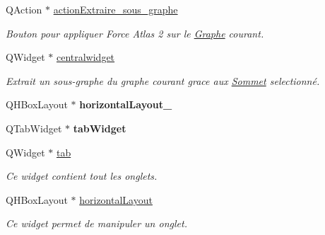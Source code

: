 \begin{DoxyCompactItemize}
Q\+Action $\ast$ \hyperlink{classUi__MainWindow_a916d6accc699ec09971de6e086049674}{action\+Extraire\+\_\+sous\+\_\+graphe}
\begin{DoxyCompactList}\small\item\em Bouton pour appliquer Force Atlas 2 sur le \hyperlink{classGraphe}{Graphe} courant. \end{DoxyCompactList}\item 
\mbox{\label{classUi__MainWindow_a39420100bfee3ba57f137af5a3b0f8e9}} 
Q\+Widget $\ast$ \hyperlink{classUi__MainWindow_a39420100bfee3ba57f137af5a3b0f8e9}{centralwidget}
\begin{DoxyCompactList}\small\item\em Extrait un sous-\/graphe du graphe courant grace aux \hyperlink{classSommet}{Sommet} selectionn\'{e}. \end{DoxyCompactList}\item 
\mbox{\label{classUi__MainWindow_a03ce63974cc69b067c91bbf285cceca8}} 
Q\+H\+Box\+Layout $\ast$ {\bfseries horizontal\+Layout\+\_}
\item 
\mbox{\label{classUi__MainWindow_a13404ee3b30e38230383dd765a5eec4a}} 
Q\+Tab\+Widget $\ast$ {\bfseries tab\+Widget}
\item 
\mbox{\label{classUi__MainWindow_a97e497a37904b5538bba9c218f40cb58}} 
Q\+Widget $\ast$ \hyperlink{classUi__MainWindow_a97e497a37904b5538bba9c218f40cb58}{tab}
\begin{DoxyCompactList}\small\item\em Ce widget contient tout les onglets. \end{DoxyCompactList}\item 
\mbox{\label{classUi__MainWindow_ae7104d878681f568e492c5bd0f653157}} 
Q\+H\+Box\+Layout $\ast$ \hyperlink{classUi__MainWindow_ae7104d878681f568e492c5bd0f653157}{horizontal\+Layout}
\begin{DoxyCompactList}\small\item\em Ce widget permet de manipuler un onglet. \end{DoxyCompactList}\item 
\mbox{\label{classUi__MainWindow_a9ee21d2c2bc000e7a8ba931bacfc5a69}} 

\end{DoxyCompactItemize}
